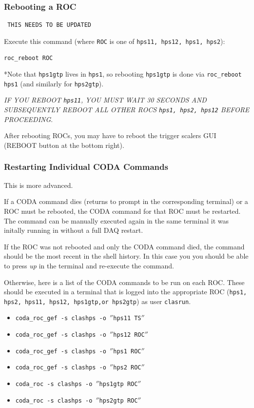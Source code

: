 \documentclass[12pt]{article}
\begin{document}
\subsubsection{Rebooting a ROC}\label{sec:roc_reboot}


\begin{verbatim} THIS NEEDS TO BE UPDATED \end{verbatim}



Execute this command (where \texttt{ROC} is one of \texttt{hps11, hps12, hps1, hps2}):\newline
\centerline{\texttt{roc\_reboot ROC}}

\vspace{5mm}\noindent
*Note that \texttt{hps1gtp} lives in \texttt{hps1}, so rebooting \texttt{hps1gtp} is done via \texttt{roc\_reboot hps1} (and similarly for \texttt{hps2gtp}).

\vspace{5mm}\noindent
{\em IF YOU REBOOT \texttt{hps11}, YOU MUST WAIT 30 SECONDS AND SUBSEQUENTLY REBOOT ALL OTHER ROCS \texttt{hps1, hps2, hps12} BEFORE PROCEEDING}.

    After rebooting ROCs, you may have to reboot the trigger scalers GUI (REBOOT button at the bottom right).
\subsubsection{Restarting Individual CODA Commands}\label{sec:codacommands}
This is more advanced.

If a CODA command dies (returns to prompt in the corresponding terminal) or a ROC must be rebooted, the CODA command for that ROC must be restarted.  The command can be manually executed again in the same terminal it was initally running in without a full DAQ restart.

If the ROC was not rebooted and only the CODA command died, the command should be the most recent in the shell history.  In this case you you should be able to press {\em up} in the terminal and re-execute the command.

Otherwise, here is a list of the CODA commands to be run on each ROC.  These should be executed in a terminal that is logged into the appropriate ROC (\texttt{hps1, hps2, hps11, hps12, hps1gtp,or hps2gtp}) as user \texttt{clasrun}.

\begin{itemize}
    \item \texttt {coda\_roc\_gef -s clashps -o $''$hps11 TS$''$}
    \item \texttt {coda\_roc\_gef -s clashps -o $''$hps12 ROC$''$}
    \item \texttt {coda\_roc\_gef -s clashps -o $''$hps1 ROC$''$}
    \item \texttt {coda\_roc\_gef -s clashps -o $''$hps2 ROC$''$}
    \item \texttt {coda\_roc -s clashps -o $''$hps1gtp ROC$''$}
    \item \texttt {coda\_roc -s clashps -o $''$hps2gtp ROC$''$}
\end{itemize}
\end{document}
